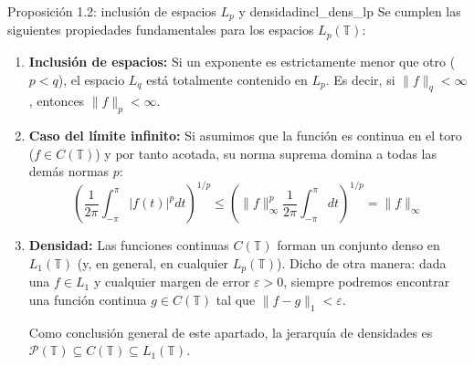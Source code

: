 \begin{proposicion}{Proposición 1.2: inclusión de espacios $L_p$ y densidad}{incl_dens_lp}
Se cumplen las siguientes propiedades fundamentales para los espacios $L_p(\mathbb{T})$:
\begin{enumerate}
    \item \textbf{Inclusión de espacios:} Si un exponente es estrictamente menor que otro ($p < q$), el espacio $L_q$ está totalmente contenido en $L_p$. Es decir, si $\|f\|_q < \infty$, entonces $\|f\|_p < \infty$.
    
    \item \textbf{Caso del límite infinito:} Si asumimos que la función es continua en el toro ($f \in C(\mathbb{T})$) y por tanto acotada, su norma suprema domina a todas las demás normas $p$:
    \begin{equation*}
        \left( \frac{1}{2\pi} \int_{-\pi}^{\pi} |f(t)|^p dt \right)^{1/p} \le \left( \|f\|_\infty^p \frac{1}{2\pi} \int_{-\pi}^{\pi} dt \right)^{1/p} = \|f\|_\infty
    \end{equation*}
    
    \item \textbf{Densidad:} Las funciones continuas $C(\mathbb{T})$ forman un conjunto denso en $L_1(\mathbb{T})$ (y, en general, en cualquier $L_p(\mathbb{T})$). Dicho de otra manera: dada una $f \in L_1$ y cualquier margen de error $\varepsilon > 0$, siempre podremos encontrar una función continua $g \in C(\mathbb{T})$ tal que $\|f - g\|_1 < \varepsilon$. 
    
    Como conclusión general de este apartado, la jerarquía de densidades es $\mathcal{P}(\mathbb{T}) \subseteq C(\mathbb{T}) \subseteq L_1(\mathbb{T})$.
\end{enumerate}
\end{proposicion}

